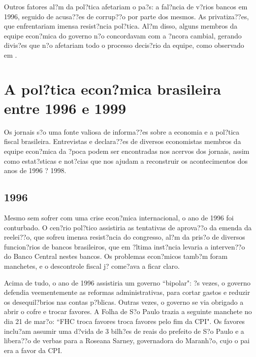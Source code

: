 \documentclass{article}
\begin{document}
Outros fatores al?m da pol?tica afetariam o pa?s: a fal?ncia de v?rios bancos em 1996, seguido de acusa??es de corrup??o por parte dos mesmos. As privatiza??es, que enfrentariam imensa resist?ncia pol?tica.  Al?m disso, alguns membros da equipe econ?mica do governo n?o concordavam com a ?ncora cambial, gerando divis?es que n?o afetariam todo o processo decis?rio da equipe, como observado em \citet{Werneck2014}.  


\section{A pol?tica econ?mica brasileira entre 1996 e 1999}

Os jornais s?o uma fonte valiosa de informa??es sobre a economia e a pol?tica fiscal brasileira. Entrevistas e declara??es de diversos economistas membros da equipe econ?mica da ?poca podem ser encontradas nos acervos dos jornais, assim como estat?sticas e not?cias que nos ajudam a reconstruir os acontecimentos dos anos de 1996 ? 1998. 

\subsection*{1996}

Mesmo sem sofrer com uma crise econ?mica internacional, o ano de 1996 foi conturbado. O cen?rio pol?tico assistiria as tentativas de aprova??o da emenda da reelei??o, que sofreu imensa resist?ncia do congresso, al?m da pris?o de diversos funcion?rios de bancos brasileiros, que em ?ltima inst?ncia levaria a interven??o do Banco Central nestes bancos. Os problemas econ?micos tamb?m foram manchetes, e o descontrole fiscal j? come?ava a ficar claro.

Acima de tudo, o ano de 1996 assistiria um governo ``bipolar": ?s vezes, o governo defendia veementemente as reformas administrativas, para cortar gastos e reduzir os desequil?brios nas contas p?blicas. Outras vezes, o governo se via obrigado a abrir o cofre e trocar favores. A Folha de S?o Paulo trazia a seguinte manchete no dia 21 de mar?o: ``FHC troca favores troca favores pelo fim da CPI".  Os favores inclu?am assumir uma d?vida de 3 bilh?es de reais do prefeito de S?o Paulo e a libera??o de verbas para a Roseana Sarney, governadora do Maranh?o, cujo o pai era a favor da CPI. %
\end{document}
